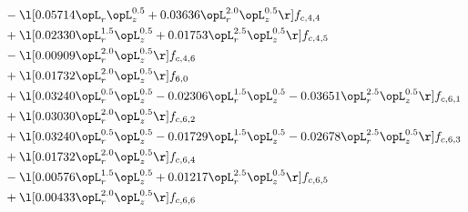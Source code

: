 \begin{alignat}{2}
& - \l[  0.05714 \opL_r \opL_z^{0.5} +  0.03636 \opL_r^{2.0} \opL_z^{0.5}  \r] f_{c,4,4} \nonumber \\ 
& + \l[  0.02330 \opL_r^{1.5} \opL_z^{0.5} +  0.01753 \opL_r^{2.5} \opL_z^{0.5}  \r] f_{c,4,5} \nonumber \\ 
& - \l[  0.00909 \opL_r^{2.0} \opL_z^{0.5}  \r] f_{c,4,6} \nonumber \\ 
& + \l[  0.01732 \opL_r^{2.0} \opL_z^{0.5}  \r] f_{6,0} \nonumber \\ 
& + \l[  0.03240 \opL_r^{0.5} \opL_z^{0.5}   -0.02306 \opL_r^{1.5} \opL_z^{0.5}   -0.03651 \opL_r^{2.5} \opL_z^{0.5}  \r] f_{c,6,1} \nonumber \\ 
& + \l[  0.03030 \opL_r^{2.0} \opL_z^{0.5}  \r] f_{c,6,2} \nonumber \\ 
& + \l[  0.03240 \opL_r^{0.5} \opL_z^{0.5}   -0.01729 \opL_r^{1.5} \opL_z^{0.5}   -0.02678 \opL_r^{2.5} \opL_z^{0.5}  \r] f_{c,6,3} \nonumber \\ 
& + \l[  0.01732 \opL_r^{2.0} \opL_z^{0.5}  \r] f_{c,6,4} \nonumber \\ 
& - \l[  0.00576 \opL_r^{1.5} \opL_z^{0.5} +  0.01217 \opL_r^{2.5} \opL_z^{0.5}  \r] f_{c,6,5} \nonumber \\ 
& + \l[  0.00433 \opL_r^{2.0} \opL_z^{0.5}  \r] f_{c,6,6} \nonumber \\ 
\end{alignat} 


